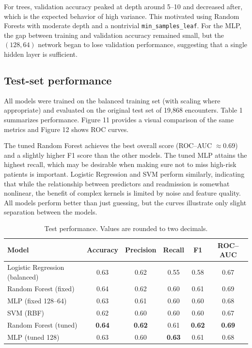 \documentclass[11pt]{article}
\begin{document}
For trees, validation accuracy peaked at depth around 5--10 and decreased after, which is the expected behavior of high variance.
This motivated using Random Forests with moderate depth and a nontrivial \texttt{min\_samples\_leaf}.
For the MLP, the gap between training and validation accuracy remained small, but the $(128, 64)$ network began to lose validation performance, suggesting that a single hidden layer is sufficient.

\subsection{Test-set performance}

All models were trained on the balanced training set (with scaling where appropriate) and evaluated on the original test set of 19{,}868 encounters.
Table 1 summarizes performance. Figure 11 provides a visual comparison of the same metrics and Figure 12 shows ROC curves.


The tuned Random Forest achieves the best overall score (ROC--AUC $\approx 0.69$) and a slightly higher F1 score than the other models.
The tuned MLP attains the highest recall, which may be desirable when making sure not to miss high-risk patients is important.
Logistic Regression and SVM perform similarly, indicating that while the relationship between predictors and readmission is somewhat nonlinear, the benefit of complex kernels is limited by noise and feature quality.
All models perform better than just guessing, but the curves illustrate only slight separation between the models.

\begin{table}[H]
\centering
\begin{tabular}{lccccc}
\toprule
Model & Accuracy & Precision & Recall & F1 & ROC--AUC \\
\midrule
Logistic Regression (balanced) & 0.63 & 0.62 & 0.55 & 0.58 & 0.67 \\
Random Forest (fixed)          & 0.64 & 0.62 & 0.60 & 0.61 & 0.69 \\
MLP (fixed 128--64)            & 0.63 & 0.61 & 0.60 & 0.60 & 0.68 \\
SVM (RBF)                      & 0.62 & 0.60 & 0.60 & 0.60 & 0.67 \\
Random Forest (tuned)          & \textbf{0.64} & \textbf{0.62} & 0.61 & \textbf{0.62} & \textbf{0.69} \\
MLP (tuned 128)                & 0.63 & 0.60 & \textbf{0.63} & 0.61 & 0.68 \\
\bottomrule
\end{tabular}
\caption{Test performance. Values are rounded to two decimals.}
\label{tab:results}
\end{table}
\end{document}
